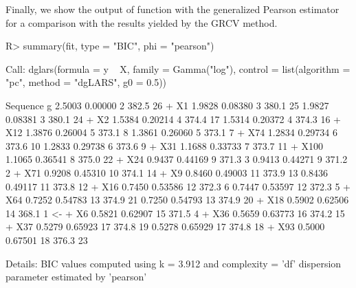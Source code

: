 Finally, we show the output of function  with the generalized Pearson estimator for a comparison with the results yielded by the GRCV method.

\begin{example}
R> summary(fit, type = "BIC", phi = "pearson")

Call:  dglars(formula = y ~ X, family = Gamma("log"), control = list(algorithm = "pc", 
    method = "dgLARS", g0 = 0.5))

  Sequence       g     %
            2.5003  0.00000   2  382.5  26   
     + X1                                    
            1.9828  0.08380   3  380.1  25   
            1.9827  0.08381   3  380.1  24   
     + X2                                    
            1.5384  0.20214   4  374.4  17   
            1.5314  0.20372   4  374.3  16   
    + X12                                    
            1.3876  0.26004   5  373.1   8   
            1.3861  0.26060   5  373.1   7   
    + X74                                    
            1.2834  0.29734   6  373.6  10   
            1.2833  0.29738   6  373.6   9   
    + X31                                    
            1.1688  0.33733   7  373.7  11   
   + X100                                    
            1.1065  0.36541   8  375.0  22   
    + X24                                    
            0.9437  0.44169   9  371.3   3   
            0.9413  0.44271   9  371.2   2   
    + X71                                    
            0.9208  0.45310  10  374.1  14   
     + X9                                    
            0.8460  0.49003  11  373.9  13   
            0.8436  0.49117  11  373.8  12   
    + X16                                    
            0.7450  0.53586  12  372.3   6   
            0.7447  0.53597  12  372.3   5   
    + X64                                    
            0.7252  0.54783  13  374.9  21   
            0.7250  0.54793  13  374.9  20   
    + X18                                    
            0.5902  0.62506  14  368.1   1 <-
     + X6                                    
            0.5821  0.62907  15  371.5   4   
    + X36                                    
            0.5659  0.63773  16  374.2  15   
    + X37                                    
            0.5279  0.65923  17  374.8  19   
            0.5278  0.65929  17  374.8  18   
    + X93                                    
            0.5000  0.67501  18  376.3  23   

Details:
	 BIC values computed using k = 3.912 and complexity = 'df'
	 dispersion parameter estimated by 'pearson'


\end{example}
